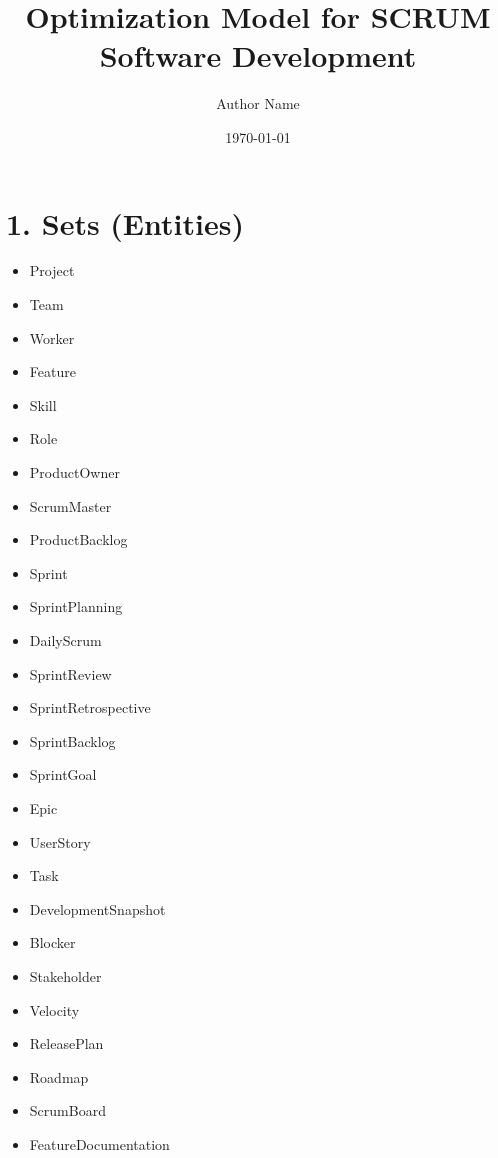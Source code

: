 \documentclass{article}
\title{Optimization Model for SCRUM Software Development}
\author{Author Name}
\date{\today}
\begin{document}
\maketitle

\tableofcontents

\section{1. Sets (Entities)}
\begin{itemize}
    \item Project
    \item Team
    \item Worker
    \item Feature
    \item Skill
    \item Role
    \item ProductOwner
    \item ScrumMaster
    \item ProductBacklog
    \item Sprint
    \item SprintPlanning
    \item DailyScrum
    \item SprintReview
    \item SprintRetrospective
    \item SprintBacklog
    \item SprintGoal
    \item Epic
    \item UserStory
    \item Task
    \item DevelopmentSnapshot
    \item Blocker
    \item Stakeholder
    \item Velocity
    \item ReleasePlan
    \item Roadmap
    \item ScrumBoard
    \item FeatureDocumentation
\end{itemize}
\end{document}
